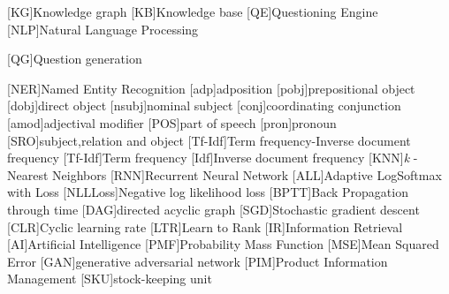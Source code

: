 

\begin{acronym}
[KG]{Knowledge graph}
[KB]{Knowledge base}
[QE]{Questioning Engine}
[NLP]{Natural Language Processing}

[QG]{Question generation}

[NER]{Named Entity Recognition}
[adp]{adposition}
[pobj]{prepositional object}
[dobj]{direct object}
[nsubj]{nominal subject}
[conj]{coordinating conjunction}
[amod]{adjectival modifier}
[POS]{part of speech}
[pron]{pronoun}
[SRO]{subject,relation and object}
[Tf-Idf]{Term frequency-Inverse document frequency}
[Tf-Idf]{Term frequency}
[Idf]{Inverse document frequency}
[KNN]{\textit{k} -Nearest Neighbors}
[RNN]{Recurrent Neural Network}
[ALL]{Adaptive LogSoftmax with Loss}
[NLLLoss]{Negative log likelihood loss}
[BPTT]{Back Propagation through time}
[DAG]{directed acyclic graph }
[SGD]{Stochastic gradient descent }
[CLR]{Cyclic learning rate }
[LTR]{Learn to Rank }
[IR]{Information Retrieval }
[AI]{Artificial Intelligence }
[PMF]{Probability Mass Function }
[MSE]{Mean Squared Error}
[GAN]{generative adversarial network}
[PIM]{Product Information Management}
[SKU]{stock-keeping unit}

\end{acronym}

